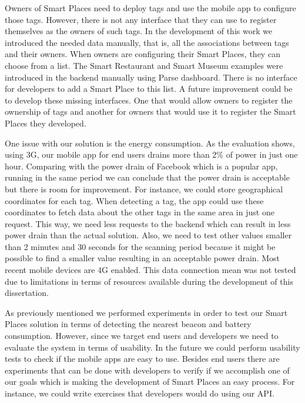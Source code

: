 Owners of Smart Places need to deploy tags and use the mobile app to configure those tags.
However, there is not any interface that they can use to register themselves as the owners of such tags.
In the development of this work we introduced the needed data manually, that is,
all the associations between tags and their owners.
When owners are configuring their Smart Places, they can choose from a list.
The Smart Restaurant and Smart Museum examples were introduced in the backend manually using Parse dashboard.
There is no interface for developers to add a Smart Place to this list.
A future improvement could be to develop these missing interfaces.
One that would allow owners to register the ownership of tags and another for owners that would use it to register the Smart Places they developed.

One issue with our solution is the energy consumption.
As the evaluation shows, using \gls{3G}, our mobile app for end users drains more than 2\% of power in just one hour.
Comparing with the power drain of Facebook which is a popular app, running in the same period we can conclude that the power drain is acceptable but there is room for improvement.
For instance, we could store geographical coordinates for each tag.
When detecting a tag, the app could use these coordinates to fetch data about the other tags in the same area in just one request.
This way, we need less requests to the backend which can result in less power drain than the actual solution.
Also, we need to test other values smaller than 2 minutes and 30 seconds for the scanning period because it might be possible to find a smaller value resulting in an acceptable power drain.
Most recent mobile devices are \gls{4G} enabled.
This data connection mean was not tested due to limitations in terms of resources available during the development of this dissertation.

As previously mentioned we performed experiments in order to test our Smart Places solution in terms of detecting the nearest beacon and battery consumption.
However, since we target end users and developers we need to evaluate the system in terms of usability.
In the future we could perform usability tests to check if the mobile apps are easy to use.
Besides end users there are experiments that can be done with developers to verify if we accomplish one of our goals which is making the development of Smart Places an easy process.
For instance, we could write exercises that developers would do using our \gls{API}.

